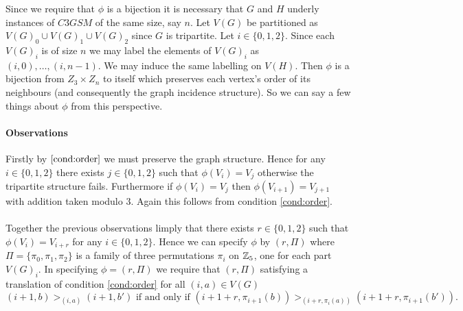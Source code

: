  \begin{note}\label{note:labels}
 Since we require that $\phi$ is a bijection it is necessary that $G$ and $H$ underly instances of $C3GSM$ of the same size, say $n$. Let $V(G)$ be partitioned as $V(G)_0 \cup V(G)_1 \cup V(G)_2$ since $G$ is tripartite. Let $i \in \{0,1,2\}$. Since each $V(G)_i$ is of size $n$ we may label the elements of $V(G)_i$ as $(i,0), \dots, (i,n-1)$. We may induce the same labelling on $V(H)$. Then $\phi$ is a bijection from $Z_3 \times Z_n$ to itself which preserves each vertex's order of its neighbours (and consequently the graph incidence structure). So we can say a few things about $\phi$ from this perspective.
 \end{note}
 \paragraph{Observations} Firstly by $\ref{cond:order}$ we must preserve the graph structure. Hence for any $i \in \{0,1,2\}$ there exists $j \in \{0,1, 2\}$ such that $\phi(V_i) = V_j$ otherwise the tripartite structure fails. Furthermore if $\phi(V_i) = V_j$ then $\phi(V_{i+1}) = V_{j+1}$ with addition taken modulo $3$. Again this follows from condition \ref{cond:order}.
\paragraph{}
Together the previous observations limply that there exists $r \in \{0,1,2\}$ such that $\phi(V_i) = V_{i+r}$ for any $i \in\{0,1,2\}$. Hence we can specify $\phi$ by $(r,\Pi)$ where $\Pi = \{\pi_0, \pi_1,\pi_2\}$ is a family of three permutations $\pi_i$ on $\mathbb{Z}_5$, one for each part $V(G)_i$. In specifying $\phi=(r,\Pi)$ we require that $(r,\Pi)$ satisfying a translation of condition \ref{cond:order} for all $(i,a) \in V(G)$
\begin{equation}\label{cond:orderT}
(i+1,b) >_{(i,a)} (i+1, b') \text{ if and only if } (i+1+r, \pi_{i+1}(b)) >_{(i+r,\pi_i(a))} (i+1+r, \pi_{i+1}(b')).
\end{equation}
